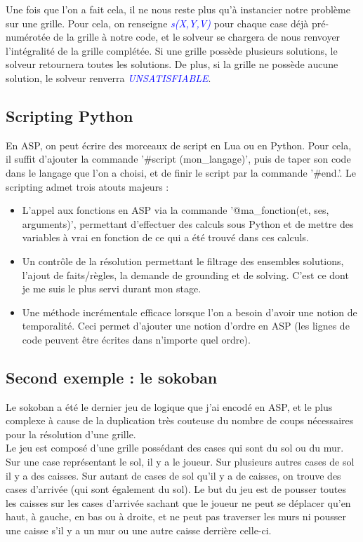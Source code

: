 \documentclass[12pt,a4paper]{article}
\begin{document}
Une fois que l'on a fait cela, il ne nous reste plus qu'à instancier notre problème sur une grille. Pour cela, on renseigne \emph{\textcolor{blue}{s(X,Y,V)}} pour chaque case déjà pré-numérotée de la grille à notre code, et le 
solveur se chargera de nous renvoyer l'intégralité de la grille complétée. Si une grille possède plusieurs solutions, le solveur retournera toutes les solutions. De plus, si la grille ne possède aucune solution, le solveur renverra 
\emph{\textcolor{blue}{UNSATISFIABLE}}.

\subsection{Scripting Python}
En ASP, on peut écrire des morceaux de script en Lua ou en Python. Pour cela, il suffit d'ajouter la commande '\#script (mon\_langage)', puis de taper son code dans le langage que l'on a choisi, et de finir le script par la 
commande '\#end.'. Le scripting admet trois atouts majeurs :
\begin{itemize}
	\item L'appel aux fonctions en ASP via la commande '@ma\_fonction(et, ses, arguments)', permettant d'effectuer des calculs sous Python et de mettre des variables à vrai en fonction de ce qui a été trouvé dans ces 
	calculs.
	\item Un contrôle de la résolution permettant le filtrage des ensembles solutions, l'ajout de faits/règles, la demande de grounding et de solving. C'est ce dont je me suis le plus servi durant mon stage.
	\item Une méthode incrémentale efficace lorsque l'on a besoin d'avoir une notion de temporalité. Ceci permet d'ajouter une notion d'ordre en ASP (les lignes de code peuvent être écrites dans n'importe quel ordre).
\end{itemize}

\subsection{Second exemple : le sokoban}
Le sokoban a été le dernier jeu de logique que j'ai encodé en ASP, et le plus complexe à cause de la duplication très couteuse du nombre de coups nécessaires pour la résolution d'une grille.\\

Le jeu est composé d'une grille possédant des cases qui sont du sol ou du mur. Sur une case représentant le sol, il y a le joueur. Sur plusieurs autres cases de sol il y a des caisses. Sur autant de cases de sol qu'il y a de 
caisses, on trouve des cases d'arrivée (qui sont également du sol). Le but du jeu est de pousser toutes les caisses sur les cases d'arrivée sachant que le joueur ne peut se déplacer qu'en haut, à gauche, en bas ou à droite, et ne 
peut pas traverser les murs ni pousser une caisse s'il y a un mur ou une autre caisse derrière celle-ci.\\ \\
\end{document}
